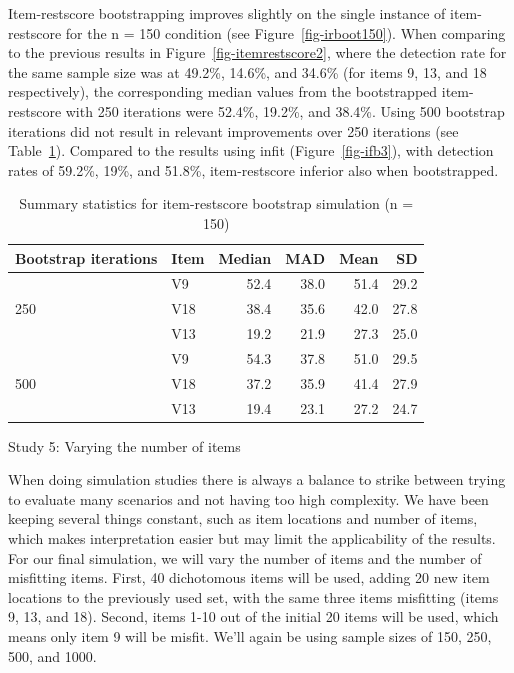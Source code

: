 \documentclass[
  letterpaper,
  DIV=11,
  numbers=noendperiod]{scrartcl}
\begin{document}
Item-restscore bootstrapping improves slightly on the single instance of
item-restscore for the n = 150 condition (see
Figure~\ref{fig-irboot150}). When comparing to the previous results in
Figure~\ref{fig-itemrestscore2}, where the detection rate for the same
sample size was at 49.2\%, 14.6\%, and 34.6\% (for items 9, 13, and 18
respectively), the corresponding median values from the bootstrapped
item-restscore with 250 iterations were 52.4\%, 19.2\%, and 38.4\%.
Using 500 bootstrap iterations did not result in relevant improvements
over 250 iterations (see Table~\ref{tbl-irb150mis}). Compared to the
results using infit (Figure~\ref{fig-ifb3}), with detection rates of
59.2\%, 19\%, and 51.8\%, item-restscore inferior also when
bootstrapped.

\begin{longtable}[]{@{}llrrrr@{}}

\caption{\label{tbl-irb150mis}Summary statistics for item-restscore
bootstrap simulation (n = 150)}

\tabularnewline

\toprule\noalign{}
Bootstrap iterations & Item & Median & MAD & Mean & SD \\
\midrule\noalign{}
\endhead
\bottomrule\noalign{}
\endlastfoot
& V9 & 52.4 & 38.0 & 51.4 & 29.2 \\
250 & V18 & 38.4 & 35.6 & 42.0 & 27.8 \\
& V13 & 19.2 & 21.9 & 27.3 & 25.0 \\
& V9 & 54.3 & 37.8 & 51.0 & 29.5 \\
500 & V18 & 37.2 & 35.9 & 41.4 & 27.9 \\
& V13 & 19.4 & 23.1 & 27.2 & 24.7 \\

\end{longtable}

Study 5: Varying the number of items

When doing simulation studies there is always a balance to strike
between trying to evaluate many scenarios and not having too high
complexity. We have been keeping several things constant, such as item
locations and number of items, which makes interpretation easier but may
limit the applicability of the results. For our final simulation, we
will vary the number of items and the number of misfitting items. First,
40 dichotomous items will be used, adding 20 new item locations to the
previously used set, with the same three items misfitting (items 9, 13,
and 18). Second, items 1-10 out of the initial 20 items will be used,
which means only item 9 will be misfit. We'll again be using sample
sizes of 150, 250, 500, and 1000.
\end{document}
